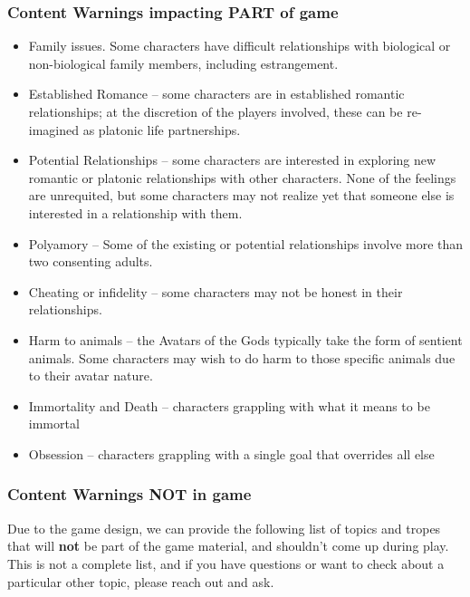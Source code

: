 \documentclass[sheet]{GL2020}
\begin{document}
\subsubsection{Content Warnings impacting PART of game}
\begin{multicols}{2}
\begin{itemize}
  	\item Family issues. Some characters have difficult relationships with biological or non-biological family members, including estrangement.
	\item Established Romance -- some characters are in established romantic relationships; at the discretion of the players involved, these can be re-imagined as platonic life partnerships.
	\item Potential Relationships -- some characters are interested in exploring new romantic or platonic relationships with other characters. None of the feelings are unrequited, but some characters may not realize yet that someone else is interested in a relationship with them.
	\item Polyamory -- Some of the existing or potential relationships involve more than two consenting adults.
	\item Cheating or infidelity -- some characters may not be honest in their relationships.
	\item Harm to animals -- the Avatars of the Gods typically take the form of sentient animals. Some characters may wish to do harm to those specific animals due to their avatar nature.
	\item Immortality and Death -- characters grappling with what it means to be immortal
	\item Obsession -- characters grappling with a single goal that overrides all else
\end{itemize}
\end{multicols}

\subsubsection{Content Warnings NOT in game}
Due to the game design, we can provide the following list of topics and tropes that will \textbf{not} be part of the game material, and shouldn’t come up during play. This is not a complete list, and if you have questions or want to check about a particular other topic, please reach out and ask.
\end{document}
